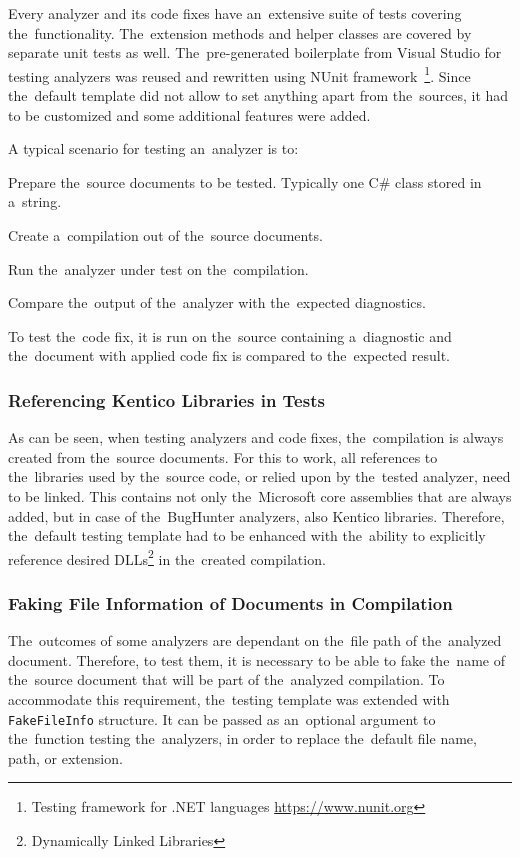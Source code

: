 \documentclass[
  digital, %
  table,   %
  lof,     %
  lot,     %
  oneside,
]{fithesis3}
\begin{document}
Every analyzer and its code fixes have an~extensive suite of tests covering the~functionality. The~extension methods and helper classes are covered by separate unit tests as well. The~pre-generated boilerplate from Visual Studio for testing analyzers was reused and rewritten using NUnit framework~\footnote{Testing framework for .NET languages \url{https://www.nunit.org}}. Since the~default template did not allow to set anything apart from the~sources, it had to be customized and some additional features were added.

A typical scenario for testing an~analyzer is to:
\begin{compactenum}
  \item Prepare the~source documents to be tested. Typically one C\# class stored in a~string.
  \item Create a~compilation out of the~source documents.
  \item Run the~analyzer under test on the~compilation.
  \item Compare the~output of the~analyzer with the~expected diagnostics.
\end{compactenum}

To test the~code fix, it is run on the~source containing a~diagnostic and the~document with applied code fix is compared to the~expected result.

\subsubsection{\textbf{Referencing Kentico Libraries in Tests}}
As can be seen, when testing analyzers and code fixes, the~compilation is always created from the~source documents. For this to work, all references to the~libraries used by the~source code, or relied upon by the~tested analyzer, need to be linked. This contains not only the~Microsoft core assemblies that are always added, but in case of the~BugHunter analyzers, also Kentico libraries. Therefore, the~default testing template had to be enhanced with the~ability to explicitly reference desired DLLs\footnote{Dynamically Linked Libraries} in the~created compilation.

\subsubsection{\textbf{Faking File Information of Documents in Compilation}}
The~outcomes of some analyzers are dependant on the~file path of the~analyzed document. Therefore, to test them, it is necessary to be able to fake the~name of the~source document that will be part of the~analyzed compilation. To accommodate this requirement, the~testing template was extended with \texttt{FakeFileInfo} structure. It can be passed as an~optional argument to the~function testing the~analyzers, in order to replace the~default file name, path, or extension.
\end{document}
